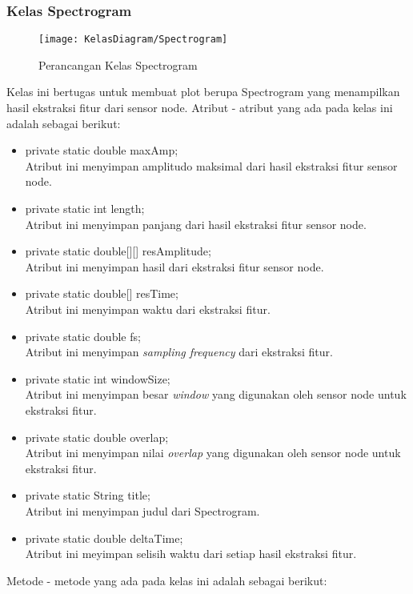 \subsubsection{Kelas Spectrogram}
\begin{figure}[H]
	\centering
	\texttt{[image: KelasDiagram/Spectrogram]}  
	\caption[Perancangan Kelas Spectrogram]{Perancangan Kelas Spectrogram} 
	\label{fig:KelasSpectrogram} 
\end{figure}
Kelas ini bertugas untuk membuat plot berupa Spectrogram yang menampilkan hasil  ekstraksi fitur dari sensor node. Atribut - atribut yang ada pada kelas ini adalah sebagai berikut:
\begin{itemize}
	\item private static double maxAmp;\\
		Atribut ini menyimpan amplitudo maksimal dari hasil ekstraksi fitur sensor node. 
	\item private static int length;\\
		Atribut ini menyimpan panjang dari hasil ekstraksi fitur sensor node.
	\item private static double[][] resAmplitude;\\
		Atribut ini menyimpan hasil dari ekstraksi fitur sensor node.
	\item private static double[] resTime;\\
		Atribut ini menyimpan waktu dari ekstraksi fitur.
	\item private static double fs;\\
		Atribut ini menyimpan {\it sampling frequency} dari ekstraksi fitur.
	\item private static int windowSize;\\
		Atribut ini menyimpan besar {\it window} yang digunakan oleh sensor node untuk ekstraksi fitur.
	\item private static double overlap;\\
		Atribut ini menyimpan nilai {\it overlap} yang digunakan oleh sensor node untuk ekstraksi fitur.
	\item private static String title;\\
		Atribut ini menyimpan judul dari Spectrogram.
	\item private static double deltaTime;\\
		Atribut ini meyimpan selisih waktu dari setiap hasil ekstraksi fitur.
\end{itemize}
Metode - metode yang ada pada kelas ini adalah sebagai berikut:

